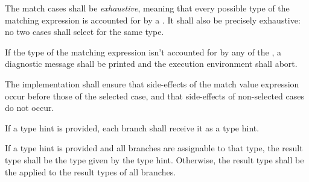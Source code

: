 \specsubsubitem
The match cases shall be \textit{exhaustive}, meaning that every possible type
of the matching expression is accounted for by a . It
shall also be precisely exhaustive: no two cases shall select for the same
type.

\specsubsubitem
If the type of the matching expression isn't accounted for by any of the
, a diagnostic message shall be printed and the
execution environment shall abort.


\specsubsubitem
The implementation shall ensure that side-effects of the match value
expression occur before those of the selected case, and that side-effects of
non-selected cases do not occur.

\specsubsubitem
If a type hint is provided, each branch shall receive it as a type hint.

\specsubsubitem
If a type hint is provided and all branches are assignable to that type, the
result type shall be the type given by the type hint. Otherwise, the result type
shall be the  applied to the result
types of all branches.


\begin{grammar}
 \\
	   \\

 \\
	 \\
	 \\
	 \\

 \\
	\terminal{*}  \\
	\terminal{(}  \terminal{)} \\

 \\
	 \\
	\terminal{(}  \terminal{)} \\

 \oneof \\
	\terminal{=}
	\terminal{+=}
	\terminal{-=}
	\terminal{*=}
	\terminal{/=}
	\terminal{\%=}
	\terminal{\textless{}\textless{}=}
	\terminal{\textgreater{}\textgreater{}=}
	\terminal{\&=}
	\terminal{|=}
	\terminal{\textasciicircum=}
	\terminal{\&\&=}
	\terminal{||=}
	\terminal{\textasciicircum\textasciicircum=}
\end{grammar}

